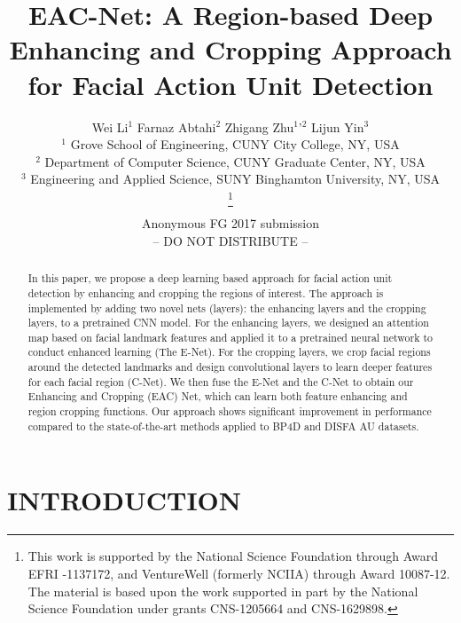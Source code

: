 \documentclass[a4paper, 10pt, conference]{ieeeconf}      %
\title{\LARGE \bf
EAC-Net: A Region-based Deep Enhancing and Cropping Approach for Facial Action Unit Detection
}
\author{\parbox{16cm}{\centering
    {\large Wei Li$^1$   Farnaz Abtahi$^2$   Zhigang Zhu$^1$'$^2$   Lijun Yin$^3$ }\\
    {\normalsize
    $^1$ Grove School of Engineering, CUNY City College, NY, USA\\
    $^2$ Department of Computer Science, CUNY Graduate Center, NY, USA\\
    $^3$ Engineering and Applied Science, SUNY Binghamton University, NY, USA}}
    \thanks{This work is supported by the National Science Foundation through Award EFRI -1137172, and VentureWell (formerly NCIIA) through Award 10087-12. The material is based upon the work supported in part by the National Science Foundation under grants CNS-1205664 and CNS-1629898.}%
}
\begin{document}
\ifFGfinal
\thispagestyle{empty}
\pagestyle{empty}
\else
\author{Anonymous FG 2017 submission\\-- DO NOT DISTRIBUTE --\\}
\pagestyle{plain}
\fi
\maketitle



\begin{abstract}

In this paper, we propose a deep learning based approach for facial action unit detection by enhancing and cropping the regions of interest. The approach is implemented by adding two novel nets (layers): the enhancing layers and the cropping layers, to a pretrained CNN model. For the enhancing layers, we designed an attention map based on facial landmark features and applied it to a pretrained neural network to conduct enhanced learning (The E-Net). For the cropping layers, we crop facial regions around the detected landmarks and design convolutional layers to learn deeper features for each facial region (C-Net). We then fuse the E-Net and the C-Net to obtain our Enhancing and Cropping (EAC) Net, which can learn both feature enhancing and region cropping functions. Our approach shows significant improvement in performance compared to the state-of-the-art methods applied to BP4D and DISFA AU datasets.

\end{abstract}


\section{INTRODUCTION}
\end{document}
